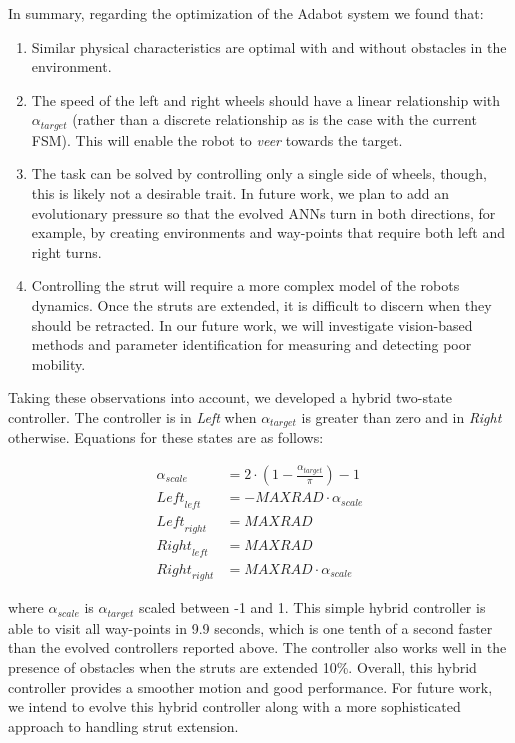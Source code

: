 In summary, regarding the optimization of the Adabot system we found that:

\begin{enumerate}

\item Similar physical characteristics are optimal with and without obstacles in the environment.

\item The speed of the left and right wheels should have a linear relationship with $\alpha_{\mathit{target}}$ (rather than a discrete relationship as is the case with the current FSM). This will enable the robot to \emph{veer} towards the target.

\item The task can be solved by controlling only a single side of wheels, though, this is likely not a desirable trait. In future work, we plan to add an evolutionary pressure so that the evolved ANNs turn in both directions, for example, by creating environments and way-points that require both left and right turns.

\item Controlling the strut will require a more complex model of the robots dynamics. Once the struts are extended, it is difficult to discern when they should be retracted. In our future work, we will investigate vision-based methods and parameter identification for measuring and detecting poor mobility.

\end{enumerate}

Taking these observations into account, we developed a hybrid two-state controller. The controller is in \emph{Left} when $\alpha_{\mathit{target}}$ is greater than zero and in \emph{Right} otherwise. Equations for these states are as follows:


\begin{align}
    \alpha_\mathit{scale} &= 2\cdot(1 - \frac{\alpha_{\mathit{target}}}{\pi}) - 1\\
    \mathit{Left}_\mathit{left} &= -\mathit{MAXRAD} \cdot \alpha_\mathit{scale}\\
    \mathit{Left}_\mathit{right} &= \mathit{MAXRAD}\\
    \mathit{Right}_\mathit{left} &= \mathit{MAXRAD}\\
    \mathit{Right}_\mathit{right} &= \mathit{MAXRAD}\cdot \alpha_\mathit{scale}
\end{align}

\noindent
where $\alpha_\mathit{scale}$ is $\alpha_{\mathit{target}}$ scaled between -1 and 1. This simple hybrid controller is able to visit all way-points in 9.9 seconds, which is one tenth of a second faster than the evolved controllers reported above. The controller also works well in the presence of obstacles when the struts are extended 10\%. Overall, this hybrid controller provides a smoother motion and good performance. For future work, we intend to evolve this hybrid controller along with a more sophisticated approach to handling strut extension.
